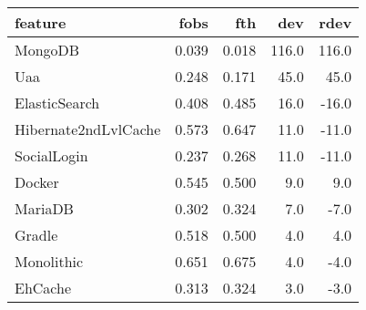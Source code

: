 \begin{tabular}{lrrrr}
\toprule
              feature &   fobs &    fth &    dev &   rdev \\
\midrule
              MongoDB &  0.039 &  0.018 &  116.0 &  116.0 \\
                  Uaa &  0.248 &  0.171 &   45.0 &   45.0 \\
        ElasticSearch &  0.408 &  0.485 &   16.0 &  -16.0 \\
 Hibernate2ndLvlCache &  0.573 &  0.647 &   11.0 &  -11.0 \\
          SocialLogin &  0.237 &  0.268 &   11.0 &  -11.0 \\
               Docker &  0.545 &  0.500 &    9.0 &    9.0 \\
              MariaDB &  0.302 &  0.324 &    7.0 &   -7.0 \\
               Gradle &  0.518 &  0.500 &    4.0 &    4.0 \\
           Monolithic &  0.651 &  0.675 &    4.0 &   -4.0 \\
              EhCache &  0.313 &  0.324 &    3.0 &   -3.0 \\
\bottomrule
\end{tabular}
